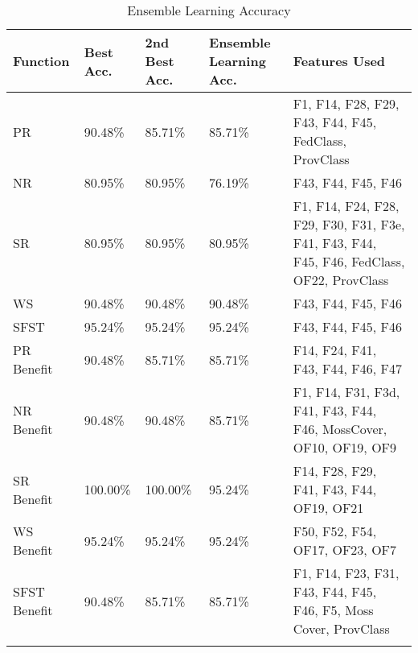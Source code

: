\begin{longtable}{|p{2cm}|p{2cm}|p{2cm}|p{2cm}|p{4cm}|}
\hline
\textbf{Function} & \textbf{Best Acc.} & \textbf{2nd Best Acc.} & \textbf{Ensemble Learning Acc.} & \textbf{Features Used} \\ \hline
PR & 90.48\% & 85.71\% & 85.71\% & F1, F14, F28, F29, F43, F44, F45, FedClass, ProvClass \\ \hline
NR & 80.95\% & 80.95\% & 76.19\% & F43, F44, F45, F46 \\ \hline
SR & 80.95\% & 80.95\% & 80.95\% & F1, F14, F24, F28, F29, F30, F31, F3e, F41, F43, F44, F45, F46, FedClass, OF22, ProvClass \\ \hline
WS & 90.48\% & 90.48\% & 90.48\% & F43, F44, F45, F46 \\ \hline
SFST & 95.24\% & 95.24\% & 95.24\% & F43, F44, F45, F46 \\ \hline
PR Benefit & 90.48\% & 85.71\% & 85.71\% & F14, F24, F41, F43, F44, F46, F47 \\ \hline
NR Benefit & 90.48\% & 90.48\% & 85.71\% & F1, F14, F31, F3d, F41, F43, F44, F46, MossCover, OF10, OF19, OF9 \\ \hline
SR Benefit & 100.00\% & 100.00\% & 95.24\% & F14, F28, F29, F41, F43, F44, OF19, OF21 \\ \hline
WS Benefit & 95.24\% & 95.24\% & 95.24\% & F50, F52, F54, OF17, OF23, OF7 \\ \hline
SFST Benefit & 90.48\% & 85.71\% & 85.71\% & F1, F14, F23, F31, F43, F44, F45, F46, F5, Moss Cover, ProvClass \\ \hline
\caption{Ensemble Learning Accuracy}
\label{tab_class_all:featred_ensemble}
\end{longtable}
